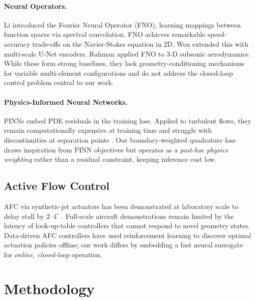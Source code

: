\documentclass[10pt,twocolumn,letterpaper]{article}
\begin{document}
\paragraph{Neural Operators.}
Li \etal \cite{Li2021FNO} introduced the Fourier Neural Operator (FNO),
learning mappings between function spaces via spectral convolution.
FNO achieves remarkable speed-accuracy trade-offs on the Navier-Stokes
equation in 2D. Wen \etal \cite{Wen2022U-FNO} extended this with
multi-scale U-Net encoders. Rahman \etal \cite{Rahman2022U-Net-FNO}
applied FNO to 3-D subsonic aerodynamics. While these form strong
baselines, they lack geometry-conditioning mechanisms for variable
multi-element configurations and do not address the closed-loop
control problem central to our work.

\paragraph{Physics-Informed Neural Networks.}
PINNs \cite{Raissi2019PINN} embed PDE residuals in the training loss.
Applied to turbulent flows, they remain computationally expensive at
training time and struggle with discontinuities at separation points
\cite{Cai2021PINN_NSE}. Our boundary-weighted quadrature loss draws
inspiration from PINN objectives but operates as a \emph{post-hoc
physics weighting} rather than a residual constraint, keeping
inference cost low.

\subsection{Active Flow Control}
\label{subsec:afc}
AFC via synthetic-jet actuators \cite{Glezer2002SyntheticJet} has been
demonstrated at laboratory scale to delay stall by $2$--$4^\circ$
\cite{Seifert1996AFC}. Full-scale aircraft demonstrations remain limited
by the latency of look-up-table controllers that cannot respond to
novel geometry states. Data-driven AFC controllers
\cite{Li2021AFC_ML,Paris2021AFC_RL} have used reinforcement learning
to discover optimal actuation policies offline; our work differs by
embedding a fast neural surrogate for \emph{online, closed-loop}
operation.

\section{Methodology}
\label{sec:method}
\end{document}

